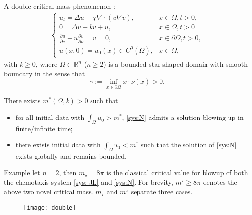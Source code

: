 \begin{frame}{A double critical mass phenomenon}
\noindent {}:
\begin{align*}
\begin{cases}\label{sys:N}\tag{N}
u_t=\Delta u-\chi\nabla \cdot\left( u \nabla v\right), &x\in\Omega, t>0,\\
0= \Delta v- kv+u,&x\in\Omega, t>0\\
\frac{\partial u}{\partial \nu}-u\frac{\partial v}{\partial \nu}=v=0, & x \in \partial \Omega, t>0, \\ u(x, 0)=u_0(x)\in C^0(\overline{\Omega}), & x \in \Omega,
\end{cases}
\end{align*}
with $k\geqslant0$, where $\Omega \subset \mathbb{R}^n$ ($n\geqslant2$) is a bounded star-shaped domain with smooth boundary in the sense that
$$
\gamma:=\inf _{x \in \partial \Omega} x \cdot \nu(x)>0 .
$$

There exists $m^\ast(\Omega,k)>0$ such that
\begin{itemize}
    \item  for \alert{all} initial data with $\int_\Omega u_0 > m^\ast$, \eqref{sys:N} admits a solution blowing up in finite/infinite time;
    \item  there exists initial data with $\int_{\Omega} u_0 < m^\ast$ such that the solution of \eqref{sys:N} exists globally and remains bounded.
\end{itemize}
\end{frame}

\begin{frame}
\begin{exampleblock}{Example}
let $n=2$, then $m_\star=8\pi$ is the classical critical value for blowup of both the chemotaxis system \eqref{sys: JL} and \eqref{sys:N}. For brevity, $m^\star\geqslant8\pi$ denotes the above two novel critical mass. $m_\star$ and $m^\star$ separate three cases.
\end{exampleblock}
\begin{figure}
\centering
\texttt{[image: double]}
\label{fig:double}
\end{figure}
  
\end{frame}



